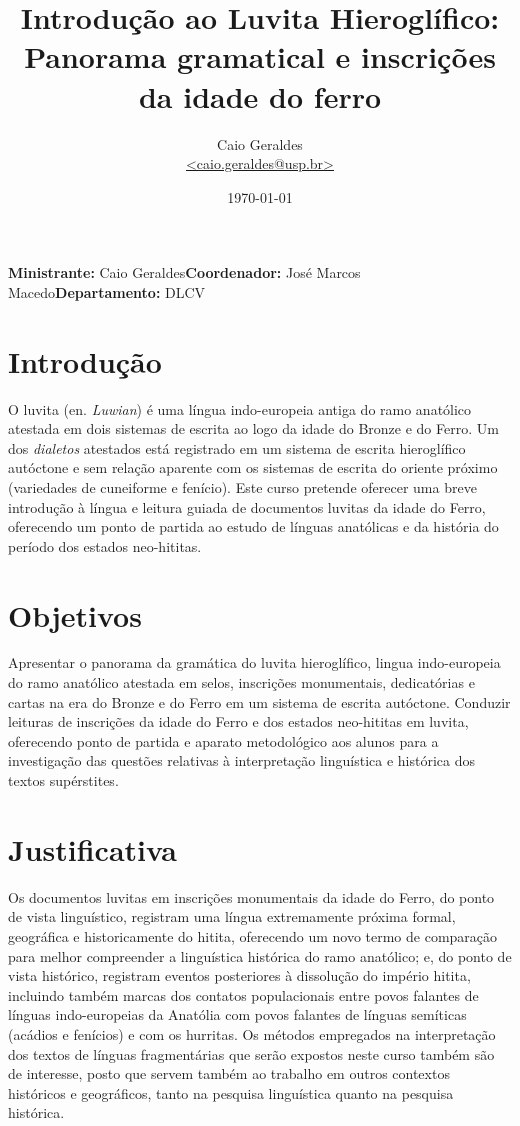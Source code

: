 \documentclass[article,12pt]{memoir}
\title{Introdução ao Luvita Hieroglífico:\\\large Panorama gramatical e inscrições da idade do ferro}
\author{Caio Geraldes\\\href{mailto:caio.geraldes@usp.br}{<caio.geraldes@usp.br>}}
\date{\today}
\begin{document}
\maketitle

\noindent\textbf{Ministrante:} Caio Geraldes\hfill\textbf{Coordenador:} José
Marcos Macedo\hfill\textbf{Departamento:} DLCV

\chapter{Introdução}

O luvita (en. \emph{Luwian}) é uma língua indo-europeia antiga do ramo
anatólico atestada em dois sistemas de escrita ao logo da idade do
Bronze e do Ferro. Um dos \emph{dialetos} atestados está registrado em
um sistema de escrita hieroglífico autóctone e sem relação aparente com
os sistemas de escrita do oriente próximo (variedades de cuneiforme e
fenício). Este curso pretende oferecer uma breve introdução à língua e
leitura guiada de documentos luvitas da idade do Ferro, oferecendo um
ponto de partida ao estudo de línguas anatólicas e da história do
período dos estados neo-hititas.

\chapter{Objetivos}

Apresentar o panorama da gramática do luvita hieroglífico, lingua
indo-europeia do ramo anatólico atestada em selos, inscrições
monumentais, dedicatórias e cartas na era do Bronze e do Ferro em um
sistema de escrita autóctone. Conduzir leituras de inscrições da idade
do Ferro e dos estados neo-hititas em luvita, oferecendo ponto de
partida e aparato metodológico aos alunos para a investigação das
questões relativas à interpretação linguística e histórica dos textos
supérstites.

\chapter{Justificativa}

Os documentos luvitas em inscrições monumentais da idade do Ferro, do
ponto de vista linguístico, registram uma língua extremamente próxima
formal, geográfica e historicamente do hitita, oferecendo um novo termo
de comparação para melhor compreender a linguística histórica do ramo
anatólico; e, do ponto de vista histórico, registram eventos posteriores
à dissolução do império hitita, incluindo também marcas dos contatos
populacionais entre povos falantes de línguas indo-europeias da Anatólia
com povos falantes de línguas semíticas (acádios e fenícios) e com os
hurritas. Os métodos empregados na interpretação dos textos de línguas
fragmentárias que serão expostos neste curso também são de interesse,
posto que servem também ao trabalho em outros contextos históricos e
geográficos, tanto na pesquisa linguística quanto na pesquisa histórica.
\end{document}
